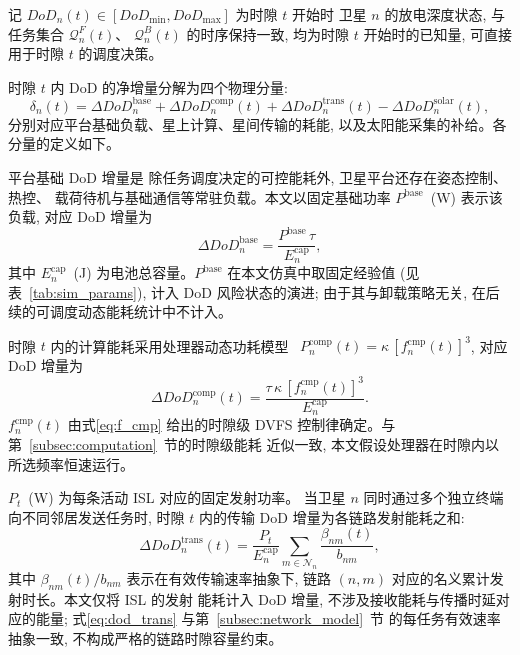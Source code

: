 \documentclass[a4paper,11pt]{article}
\begin{document}
记 $DoD_n(t) \in [DoD_{\min}, DoD_{\max}]$ 为时隙 $t$ 开始时
卫星 $n$ 的放电深度状态, 与任务集合 $\mathcal{Q}^F_n(t)$、
$\mathcal{Q}^B_n(t)$ 的时序保持一致, 均为时隙 $t$ 开始时的已知量,
可直接用于时隙 $t$ 的调度决策。

时隙 $t$ 内 DoD 的净增量分解为四个物理分量:
\begin{equation}
    \delta_n(t) = \Delta DoD^{\mathrm{base}}_n
    + \Delta DoD^{\mathrm{comp}}_n(t)
    + \Delta DoD^{\mathrm{trans}}_n(t)
    - \Delta DoD^{\mathrm{solar}}_n(t),
    \label{eq:delta_dod}
\end{equation}
分别对应平台基础负载、星上计算、星间传输的耗能, 
以及太阳能采集的补给。各分量的定义如下。

平台基础 DoD 增量是
除任务调度决定的可控能耗外, 卫星平台还存在姿态控制、热控、
载荷待机与基础通信等常驻负载。本文以固定基础功率
$P^{\mathrm{base}}$~(W) 表示该负载, 对应 DoD 增量为
\begin{equation}
    \Delta DoD^{\mathrm{base}}_n
    = \frac{P^{\mathrm{base}}\, \tau}{E^{\mathrm{cap}}_n},
    \label{eq:dod_base}
\end{equation}
其中 $E^{\mathrm{cap}}_n$~(J) 为电池总容量。$P^{\mathrm{base}}$
在本文仿真中取固定经验值 (见表~\ref{tab:sim_params}), 
计入 DoD 风险状态的演进; 由于其与卸载策略无关,
在后续的可调度动态能耗统计中不计入。


时隙 $t$ 内的计算能耗采用处理器动态功耗模型~\cite{zhang2024mhspo,li2024battery}
$P^{\mathrm{comp}}_n(t) = \kappa\, [f^{\mathrm{cmp}}_n(t)]^3$, 
对应 DoD 增量为
\begin{equation}
    \Delta DoD^{\mathrm{comp}}_n(t)
    = \frac{\tau\, \kappa\, [f^{\mathrm{cmp}}_n(t)]^3}{E^{\mathrm{cap}}_n}.
    \label{eq:dod_comp}
\end{equation}
$f^{\mathrm{cmp}}_n(t)$ 由式\eqref{eq:f_cmp} 给出的时隙级 DVFS
控制律确定。与第~\ref{subsec:computation}~节的时隙级能耗
近似一致, 本文假设处理器在时隙内以所选频率恒速运行。


$P_t$~(W) 为每条活动 ISL 对应的固定发射功率。
当卫星 $n$ 同时通过多个独立终端向不同邻居发送任务时,
时隙 $t$ 内的传输 DoD 增量为各链路发射能耗之和:
\begin{equation}
    \Delta DoD^{\mathrm{trans}}_n(t)
    = \frac{P_t}{E^{\mathrm{cap}}_n} \sum_{m \in \mathcal{N}_n}
    \frac{\beta_{nm}(t)}{b_{nm}},
    \label{eq:dod_trans}
\end{equation}
其中 $\beta_{nm}(t)/b_{nm}$ 表示在有效传输速率抽象下, 
链路 $(n,m)$ 对应的名义累计发射时长。本文仅将 ISL 的发射
能耗计入 DoD 增量, 不涉及接收能耗与传播时延对应的能量; 
式\eqref{eq:dod_trans} 与第~\ref{subsec:network_model}~节
的每任务有效速率抽象一致, 不构成严格的链路时隙容量约束。
\end{document}
